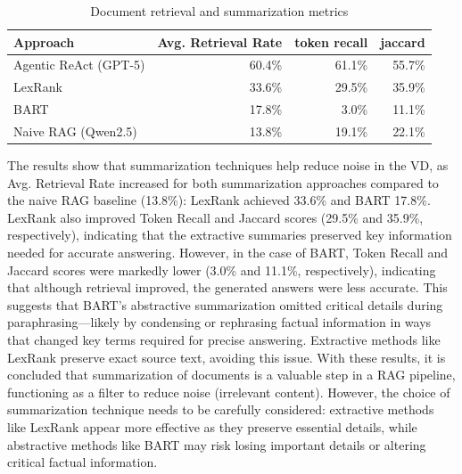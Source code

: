 \begin{table}[t]
\centering
\caption{Document retrieval and summarization metrics}
\label{tab:document_retrieved_metrics_summarization}
\begin{tabular}{lrrr}
\hline
Approach & Avg. Retrieval Rate & token recall & jaccard \\
\hline
Agentic ReAct (\gls{GPT}-5)& 60.4\% & 61.1\%  & 55.7\%\\
LexRank & 33.6\% & 29.5\%  & 35.9\% \\
BART & 17.8\% & 3.0\% & 11.1\% \\
Naive \gls{RAG} (Qwen2.5) & 13.8\% & 19.1\% & 22.1\% \\
\hline
\end{tabular}
\end{table}

The results show that summarization techniques help reduce noise in the \gls{VD}, as Avg. Retrieval Rate increased for both summarization approaches compared to the naive RAG baseline (13.8\%): LexRank achieved 33.6\% and BART 17.8\%.
LexRank also improved Token Recall and Jaccard scores (29.5\% and 35.9\%, respectively), indicating that the extractive summaries preserved key information needed for accurate answering.
However, in the case of BART, Token Recall and Jaccard scores were markedly lower (3.0\% and 11.1\%, respectively), indicating that although retrieval improved, the generated answers were less accurate. This suggests that BART's abstractive summarization omitted critical details during paraphrasing—likely by condensing or rephrasing factual information in ways that changed key terms required for precise answering. Extractive methods like LexRank preserve exact source text, avoiding this issue.
With these results, it is concluded that summarization of documents is a valuable step in a \gls{RAG} pipeline, functioning as a filter to reduce noise (irrelevant content).
However, the choice of summarization technique needs to be carefully considered: extractive methods like LexRank appear more effective as they preserve essential details, while abstractive methods like BART may risk losing important details or altering critical factual information.

 

